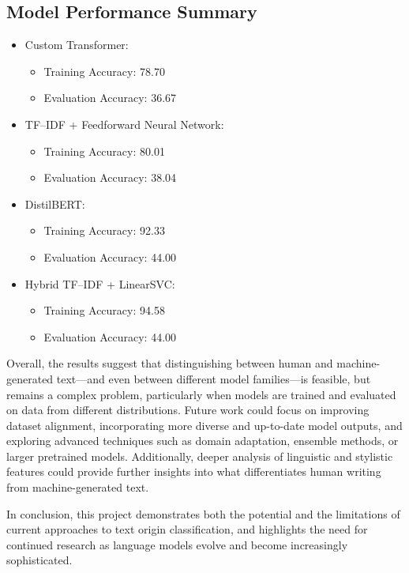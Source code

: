 \documentclass[11pt,a4paper]{article}
\begin{document}
\subsection*{Model Performance Summary}

\begin{itemize}
    \item Custom Transformer:
    \begin{itemize}
        \item Training Accuracy: 78.70
        \item Evaluation Accuracy: 36.67
    \end{itemize}
    
    \item TF--IDF + Feedforward Neural Network:
    \begin{itemize}
        \item Training Accuracy: 80.01
        \item Evaluation Accuracy: 38.04
    \end{itemize}
    
    \item DistilBERT:
    \begin{itemize}
        \item Training Accuracy: 92.33
        \item Evaluation Accuracy: 44.00
    \end{itemize}
    
    \item Hybrid TF--IDF + LinearSVC:
    \begin{itemize}
        \item Training Accuracy: 94.58
        \item Evaluation Accuracy: 44.00
    \end{itemize}
\end{itemize}

Overall, the results suggest that distinguishing between human and machine-generated text—and even between different model families—is feasible, but remains a complex problem, particularly when models are trained and evaluated on data from different distributions. Future work could focus on improving dataset alignment, incorporating more diverse and up-to-date model outputs, and exploring advanced techniques such as domain adaptation, ensemble methods, or larger pretrained models. Additionally, deeper analysis of linguistic and stylistic features could provide further insights into what differentiates human writing from machine-generated text.

In conclusion, this project demonstrates both the potential and the limitations of current approaches to text origin classification, and highlights the need for continued research as language models evolve and become increasingly sophisticated.
\end{document}
